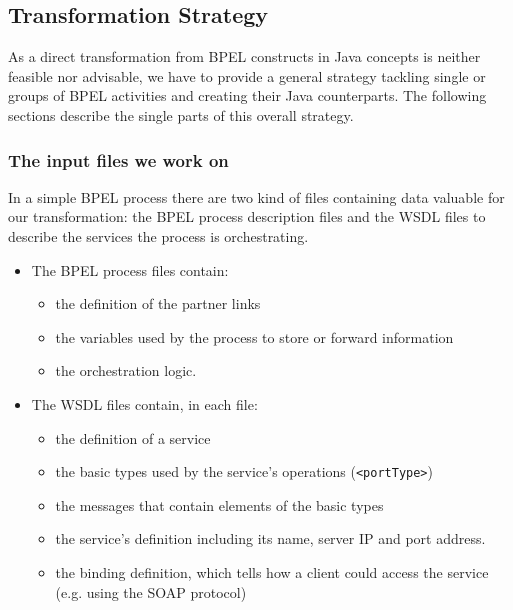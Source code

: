\subsection{Transformation Strategy}
\label{sec:TransformationStrategy}
As a direct transformation from BPEL constructs in Java concepts is neither feasible nor advisable, we have to provide a general strategy tackling single or groups of BPEL activities and creating their Java counterparts. The following sections describe the single parts of this overall strategy.

\subsubsection{The input files we work on}
\label{sec:inputFiles}
In a simple BPEL process there are two kind of files containing data valuable for our transformation: the BPEL process description files and the WSDL files to describe the services the process is orchestrating.
\begin{itemize} 
  \item The BPEL process files contain:
\begin{itemize}
 \item the definition of the partner links
 \item the variables used by the process to store or forward information
 \item the orchestration logic.
\end{itemize}
\item The WSDL files contain, in each file: 
\begin{itemize}
 \item the definition of a service
 \item the basic types used by the service's operations (\verb|<portType>|)
 \item the messages that contain elements of the basic types
 \item the service's definition including its name, server IP and port address. 
 \item the binding definition, which tells how a client could access the service (e.g. using the SOAP protocol)
\end{itemize}
\end{itemize}

